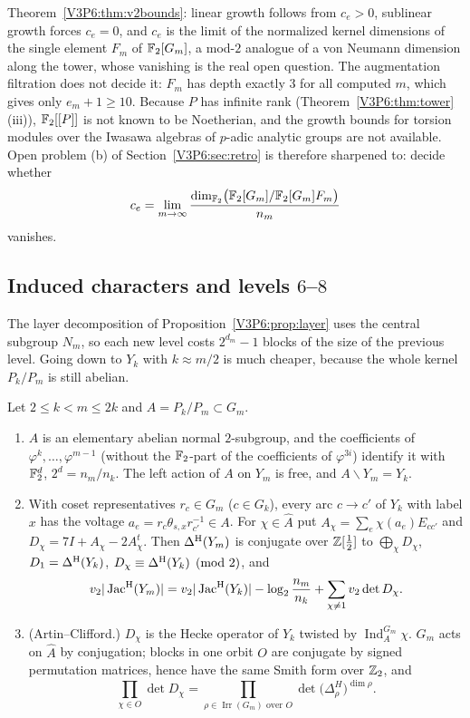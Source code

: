 \begin{remark}
Theorem~\ref{V3P6:thm:v2bounds}: linear growth follows from $c_e>0$, sublinear growth forces
$c_e=0$, and $c_e$ is the limit of the normalized kernel dimensions of the single element $F_m$
of $\mathbb{F}_2[G_m]$, a mod-$2$ analogue of a von Neumann dimension along the tower, whose
vanishing is the real open question. The augmentation filtration does not decide it: $F_m$ has
depth exactly $3$ for all computed $m$, which gives only $e_m+1\ge10$. Because $P$ has infinite
rank (Theorem~\ref{V3P6:thm:tower}(iii)), $\mathbb{F}_2[[P]]$ is not known to be Noetherian, and the
growth bounds for torsion modules over the Iwasawa algebras of $p$-adic analytic groups are not
available. Open problem (b) of Section~\ref{V3P6:sec:retro} is therefore sharpened to: decide
whether
\[
c_e=\lim_{m\to\infty}\frac{\dim_{\mathbb{F}_2}\bigl(\mathbb{F}_2[G_m]/\mathbb{F}_2[G_m]F_m\bigr)}{n_m}
\]
vanishes.
\end{remark}

\subsection*{Induced characters and levels $6$--$8$}

The layer decomposition of Proposition~\ref{V3P6:prop:layer} uses the central subgroup $N_m$, so
each new level costs $2^{d_m}-1$ blocks of the size of the previous level. Going down to
$Y_k$ with $k\approx m/2$ is much cheaper, because the whole kernel $P_k/P_m$ is still abelian.

\begin{proposition}\label{V3P6:prop:induced}
Let $2\le k<m\le2k$ and $A=P_k/P_m\subset G_m$.
\begin{enumerate}
\item[(i)] $A$ is an elementary abelian normal $2$-subgroup, and the coefficients of
$\varphi^{k},\dots,\varphi^{m-1}$ (without the $\mathbb{F}_2$-part of the coefficients of $\varphi^{3i}$)
identify it with $\mathbb{F}_2^{d}$, $2^{d}=n_m/n_k$. The left action of $A$ on $Y_m$ is free, and
$A\backslash Y_m=Y_k$.
\item[(ii)] With coset representatives $r_c\in G_m$ ($c\in G_k$), every arc $c\to c'$ of $Y_k$ with
label $x$ has the voltage $a_e=r_c\theta_{s,x}r_{c'}^{-1}\in A$. For $\chi\in\widehat A$ put
$A_\chi=\sum_e\chi(a_e)E_{cc'}$ and $D_\chi=7I+A_\chi-2A_\chi^{t}$. Then
$\Delta^{\mathrm{H}}(Y_m)$ is conjugate over $\mathbb{Z}[\frac12]$ to $\bigoplus_\chi D_\chi$, $D_1=\Delta^{\mathrm{H}}(Y_k)$,
$D_\chi\equiv\Delta^{\mathrm{H}}(Y_k)\pmod2$, and
\[
v_2|\operatorname{Jac}^{\mathrm{H}}(Y_m)|=v_2|\operatorname{Jac}^{\mathrm{H}}(Y_k)|-\log_2\frac{n_m}{n_k}+\sum_{\chi\ne1}v_2\det D_\chi .
\]
\item[(iii)] (Artin--Clifford.) $D_\chi$ is the Hecke operator of $Y_k$ twisted by
$\operatorname{Ind}_A^{G_m}\chi$. $G_m$ acts on $\widehat A$ by conjugation; blocks in one orbit
$O$ are conjugate by signed permutation matrices, hence have the same Smith form over $\mathbb{Z}_2$, and
\[
\prod_{\chi\in O}\det D_\chi=\prod_{\rho\in\operatorname{Irr}(G_m)\text{ over }O}\det\bigl(\Delta^{H}_\rho\bigr)^{\dim\rho}.
\]
\end{enumerate}
\end{proposition}

